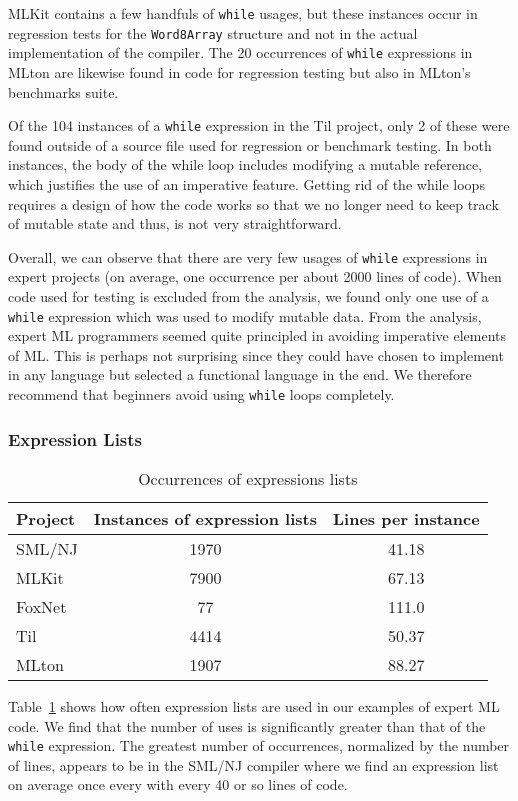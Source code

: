 \documentclass[12pt,abstracton]{scrartcl}
\begin{document}
MLKit contains a few handfuls of \texttt{while} usages, but these instances
occur in regression tests for the \texttt{Word8Array} structure and not in the actual implementation of the compiler.
The 20 occurrences of \texttt{while} expressions in MLton are likewise found in code for regression testing but
also in MLton's benchmarks suite.

Of the 104 instances of a \texttt{while} expression in the Til project,
only 2 of these were found outside of a source file used for regression or benchmark testing.
In both instances, the body of the while loop includes modifying a mutable reference, which justifies the use of
an imperative feature. Getting rid of the while loops requires a design of how the code works so
that we no longer need to keep track of mutable state and thus, is not very straightforward.

Overall, we can observe that there are very few usages of \texttt{while} expressions
in expert projects (on average, one occurrence per about 2000 lines of code).
When code used for testing is excluded from the analysis, we found only one use
of a \texttt{while} expression which was used to modify mutable data.
From the analysis, expert ML programmers seemed quite principled in avoiding imperative
elements of ML. This is perhaps not surprising since they could have chosen
to implement in any language but selected a functional language in the end.
We therefore recommend that beginners avoid using \texttt{while} loops completely.
\subsubsection{Expression Lists}
\begin{table}[h!]
\centering
\begin{tabular}{|l||c|c|}
\hline
Project & Instances of expression lists & Lines per instance \\ \hline\hline
SML/NJ & 1970 & 41.18 \\ 
MLKit & 7900 & 67.13 \\
FoxNet & 77 & 111.0 \\
Til & 4414 & 50.37 \\
MLton & 1907 & 88.27 \\ \hline
\end{tabular}
\caption{Occurrences of expressions lists}
\label{table:explist}
\end{table}
Table~\ref{table:explist} shows how often expression lists are used in our
examples of expert ML code. We find that the number of uses is significantly
greater than that of the \texttt{while} expression. The greatest number
of occurrences, normalized by the number of lines, appears to be in the SML/NJ
compiler where we find an expression list on average once every with every
40 or so lines of code.
\end{document}
